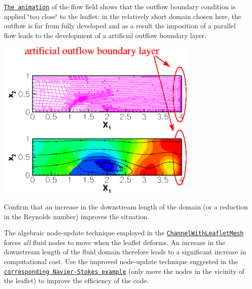 \begin{DoxyEnumerate}
\item \href{../figures/fsi_channel_with_leaflet_flow.avi}{\tt The animation} of the flow field shows that the outflow boundary condition is applied \char`\"{}too close\char`\"{} to the leaflet\+: in the relatively short domain chosen here, the outflow is far from fully developed and as a result the imposition of a parallel flow leads to the development of a artificial outflow boundary layer. ~\newline
~\newline
 
\begin{DoxyImage}
\includegraphics[width=0.75\textwidth]{outflow_bl}
\end{DoxyImage}
 Confirm that an increase in the downstream length of the domain (or a reduction in the Reynolds number) improves the situation. ~\newline
~\newline

\item The algebraic node-\/update technique employed in the \href{../../../meshes/mesh_list/html/index.html#channel_with_leaflet}{\tt {\ttfamily Channel\+With\+Leaflet\+Mesh}} forces {\itshape all} fluid nodes to move when the leaflet deforms. An increase in the downstream length of the fluid domain therefore leads to a significant increase in computational cost. Use the improved node-\/update technique suggested in the \href{../../../navier_stokes/channel_with_leaflet/html/index.html#ex}{\tt corresponding Navier-\/\+Stokes example} (only move the nodes in the vicinity of the leaflet) to improve the efficiency of the code.
\end{DoxyEnumerate}

 

